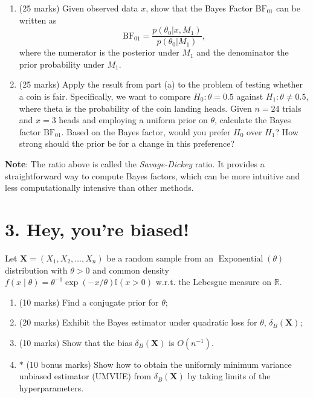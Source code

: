 \documentclass[a4paper,10pt, notitlepage]{report}
\newcommand{\rs}{X_1, X_2, \ldots, X_n} %
\newcommand{\bX}{\boldsymbol{X}} %
\newif\ifanswers
\begin{document}
\begin{enumerate}[label=\alph*)] 
 \item (25 marks)  Given observed data $x$, show that the Bayes Factor $\operatorname{BF_{01}}$ can be written as
    \begin{equation*}
        \operatorname{BF_{01}} = \frac{p(\theta_0| x, M_1)}{p(\theta_0|M_1)},
    \end{equation*}
    where the numerator is the posterior under $M_1$ and the denominator the prior probability under $M_1$.
  \item (25 marks) Apply the result from part (a) to the problem of testing whether a coin is fair.
    Specifically, we want to compare $H_0: \theta = 0.5$ against $H_1: \theta \neq 0.5$, where theta is the probability of the coin landing heads.
    Given $n=24$ trials and $x = 3$ heads and employing a uniform prior on $\theta$, calculate the Bayes factor $\operatorname{BF_{01}}$.
    Based on the Bayes factor, would you prefer $H_0$ over $H_1$? How strong should the prior be for a change in this preference?
\end{enumerate}
\textbf{Note}: The ratio above is called the \textit{Savage-Dickey} ratio. It provides a straightforward way to compute Bayes factors, which can be more intuitive and less computationally intensive than other methods.
\ifanswers

\fi

\section*{3. Hey, you're biased! }

Let $\bX = (\rs)$ be a random sample from an $\operatorname{Exponential}(\theta)$ distribution with $\theta > 0$ and common density $f(x \mid \theta) = \theta^{-1}\exp(-x/\theta)\mathbb{I}(x > 0)$ w.r.t. the Lebesgue measure on $\mathbb{R}$.

\begin{enumerate}[label=\alph*)]
 \item (10 marks) Find a conjugate prior for $\theta$;
 \item (20 marks)  Exhibit the Bayes estimator under quadratic loss for $\theta$, $\delta_B(\bX)$;
 \item (10 marks) Show that the bias $\delta_B(\bX)$ is $O(n^{-1})$.
 \item $\ast$ (10 bonus marks) Show how to obtain the uniformly minimum variance unbiased estimator (UMVUE) from $\delta_B(\bX)$ by taking limits of the hyperparameters.
 \end{enumerate}

\ifanswers

\fi



\end{document}
